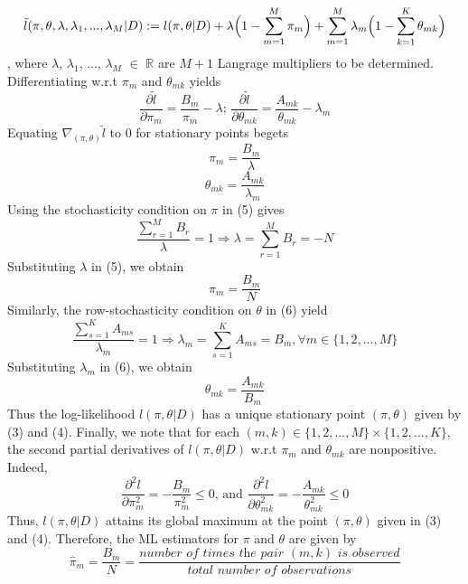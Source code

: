 \documentclass[9pt]{article}
\begin{document}
\begin{dmath}
\tilde{l}(\pi, \theta, \lambda, \lambda_{1}, ..., \lambda_{M} | D) := l(\pi, \theta| D) + \lambda\Bigl(1 - \sum_{m=1}^{M}{\pi_{m}}\Bigr) + \sum_{m=1}^{M}{\lambda_{m}\Bigl(1 - \sum_{k=1}^{K}{\theta_{mk}}\Bigr)}
\end{dmath}
, where $\lambda$, $\lambda_{1}$, ..., $\lambda_{M}$ $\in$ $\mathbb{R}$ are $M + 1$ Langrage multipliers to be determined.
Differentiating w.r.t $\pi_{m}$ and $\theta_{mk}$ yields
\[ \frac{\partial \tilde{l}}{\partial \pi_{m}} = \frac{B_{m}}{\pi_{m}} -\lambda\text{; }\frac{\partial \tilde{l}}{\partial \theta_{mk}} = \frac{A_{mk}}{\theta_{mk}} -\lambda_{m} \]
Equating $\nabla_{(\pi, \theta)}{\tilde{l}}$ to 0 for stationary points begets
\begin{dmath}
\pi_{m} = \frac{B_{m}}{\lambda}
\end{dmath}
\begin{dmath}
\theta_{mk} = \frac{A_{mk}}{\lambda_{m}}
\end{dmath}
Using the stochasticity condition on $\pi$ in (5) gives
\[ \frac{\sum_{r=1}^{M}{B_{r}}}{\lambda} = 1 \Rightarrow \lambda = \sum_{r=1}^{M}{B_{r}} = -N \]
Substituting $\lambda$ in (5), we obtain
\begin{dmath}
\pi_{m} = \frac{B_{m}}{N}
\end{dmath}
Similarly, the row-stochasticity condition on $\theta$ in (6) yield
\[ \frac{\sum_{s=1}^{K}{A_{ms}}}{\lambda_{m}} = 1 \Rightarrow \lambda_{m} = \sum_{s=1}^{K}{A_{ms}} = B_{m}, \forall m \in \{1, 2, ..., M\} \]
Substituting $\lambda_{m}$ in (6), we obtain
\begin{dmath}
\theta_{mk} = \frac{A_{mk}}{B_{m}}
\end{dmath}
Thus the log-likelihood $l(\pi, \theta | D)$ has a unique stationary point $(\pi, \theta)$ given by (3) and (4).
Finally,  we note that for each $(m, k) \in \{1, 2, ..., M\} \times \{1, 2, ..., K\}$, the second partial derivatives of $l(\pi, \theta | D)$
 w.r.t $\pi_{m}$ and $\theta_{mk}$ are nonpositive. Indeed,
\[ \frac{\partial^2 l}{\partial \pi_{m}^2} = -\frac{B_{m}}{\pi_{m}^{2}} \le 0\text{, and }\frac{\partial^2 l}{\partial \theta_{mk}^2} = -\frac{A_{mk}}{\theta_{mk}^{2}} \le 0 \]
Thus, $l(\pi, \theta| D)$ attains its global maximum at the point $(\pi, \theta)$ given in (3) and (4).
Therefore, the ML estimators for $\pi$ and $\theta$ are given by
\begin{equation}
\hat{\pi}_{m} = \frac{B_{m}}{N} = \frac{\textit{number of times the pair  }(m, k)\textit{ is observed}}{\textit{total number of observations}}
\end{equation}
\end{document}
